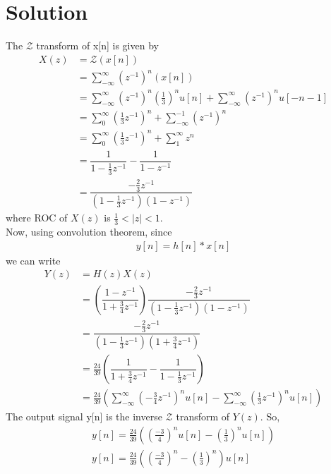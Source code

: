 \documentclass[journal,12pt,twocolumn]{IEEEtran}
\begin{document}
\section{Solution}
The $\mathcal{Z}$ transform of x[n] is given by
\begin{align}
    X(z)&=\mathcal{Z}(x[n])\\
    &= \sum_{-\infty}^\infty (z^{-1})^n(x[n])\\
    &= \sum_{-\infty}^\infty (z^{-1})^n \left(\frac{1}{3}\right)^n u[n]+\sum_{-\infty}^\infty (z^{-1})^n u[-n-1]\\
    &= \sum_{0}^\infty \left(\frac{1}{3}z^{-1}\right)^n + \sum_{-\infty}^{-1} (z^{-1})^n\\
    &= \sum_{0}^\infty \left(\frac{1}{3}z^{-1}\right)^n + \sum_1^{\infty}z^n\\
    &= \dfrac{1}{1-\frac{1}{3}z^{-1}}-\dfrac{1}{1-z^{-1}}\\
    &= \dfrac{-\frac{2}{3}z^{-1}}{(1-\frac{1}{3}z^{-1})(1-z^{-1})}
\end{align}
where ROC of $X(z)$ is $\frac{1}{3}<|z|<1$.\\
Now, using convolution theorem, since
\begin{align}
    y[n]=h[n]*x[n]
\end{align}
we can write
\begin{align}
    Y(z)&= H(z)X(z)\\
    &= \left(\dfrac{1-z^{-1}}{1+\frac{3}{4}z^{-1}}\right)\dfrac{-\frac{2}{3}z^{-1}}{(1-\frac{1}{3}z^{-1})(1-z^{-1})}\\
    &= \dfrac{-\frac{2}{3}z^{-1}}{(1-\frac{1}{3}z^{-1})(1+\frac{3}{4}z^{-1})}\\
    &= \frac{24}{39}\left(\dfrac{1}{1+\frac{3}{4}z^{-1}}-\dfrac{1}{1-\frac{1}{3}z^{-1}}\right)\\
    &= \frac{24}{39}\left(\sum_{-\infty}^\infty \left(-\frac{3}{4}z^{-1}\right)^n u[n]-\sum_{-\infty}^\infty \left(\frac{1}{3}z^{-1}\right)^n u[n]\right)
\end{align}
The output signal y[n] is the inverse $\mathcal{Z}$ transform of $Y(z)$.
So,
\begin{align}
    y[n] = \frac{24}{39}\left(\left(\frac{-3}{4}\right)^n u[n] - \left(\frac{1}{3}\right)^n u[n]\right)\\
    y[n] = \frac{24}{39}\left(\left(\frac{-3}{4}\right)^n-\left(\frac{1}{3}\right)^n\right)u[n]
\end{align}
\end{document}
